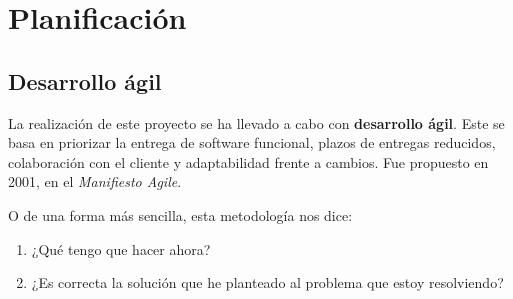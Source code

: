 \chapter{Planificación}

\section{Desarrollo ágil}
La realización de este proyecto se ha llevado a cabo con \textbf{desarrollo ágil}. Este se basa en priorizar la entrega de software funcional, plazos de entregas reducidos, colaboración con el cliente y adaptabilidad frente a cambios. Fue propuesto en 2001, en el \textit{Manifiesto Agile}.\cite{agile}

O de una forma más sencilla, esta metodología nos dice:
\begin{enumerate}
    \item ¿Qué tengo que hacer ahora?
    \item ¿Es correcta la solución que he planteado al problema que estoy resolviendo?
\end{enumerate}

